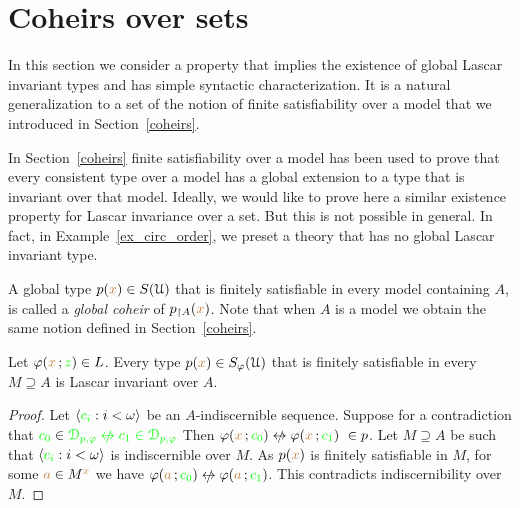 \section{Coheirs over sets}\label{coheirs_sets}

In this section we consider a property that implies the existence of global Lascar invariant types and has simple syntactic characterization.
It is a natural generalization to a set of the notion of finite satisfiability over a model that we introduced in Section~\ref{coheirs}.

In Section~\ref{coheirs} finite satisfiability over a model has been used to prove that every consistent type over a model has a global extension to a type that is invariant over that model. 
Ideally, we would like to prove here a similar existence property for Lascar invariance over a set.
But this is not possible in general.
In fact, in Example~\ref{ex_circ_order}, we preset a theory that has no global Lascar invariant type.


A global type $p({\color{brown} x})\in S(\EuScript U)$ that is finitely satisfiable in every model containing $A$, is called a \emph{global coheir\/} of $p_{\restriction A}({\color{brown} x})$. 
Note that when $A$ is a model we obtain the same notion defined in Section~\ref{coheirs}.

\begin{proposition} 
  Let $\varphi({\color{brown} x}\,;{\color{green} z})\in L$.
  Every type $p({\color{brown} x})\in S_\varphi(\EuScript U)$ that is finitely satisfiable in every $M\supseteq A$ is Lascar invariant over $A$.
\end{proposition}

\begin{proof}
  Let $\langle{\color{green}c_i}:i<\omega\rangle$ be an $A\mbox{-}$indiscernible sequence.
  Suppose for a contradiction that ${\gr c_0}\in\gr\D_{p,\phi}\niff{\gr c_1}\in\gr\D_{p,\phi}$
  Then $\phi({\mr x}\,;{\gr c_0})\niff\phi({\mr x}\,;{\gr c_1})\ \in p$.
  Let $M\supseteq A$ be such that $\langle{\color{green}c_i}:i<\omega\rangle$ is indiscernible over $M$.
  As $p({\color{brown} x})$ is finitely satisfiable in $M$, for some ${\color{brown} a}\in M^{\color{brown} x}$ we have $\phi({\mr a}\,;{\gr c_0})\niff\phi({\mr a}\,;{\gr c_1})$.
  This contradicts indiscernibility over $M$.
\end{proof}

